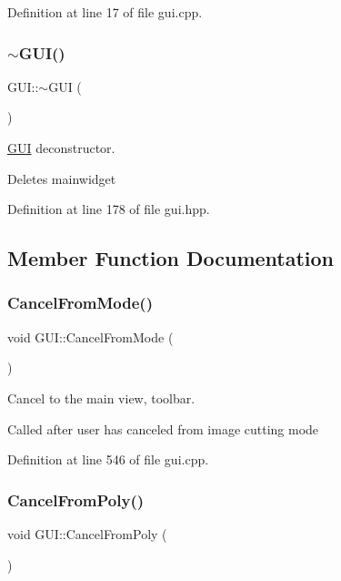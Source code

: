Definition at line 17 of file gui.\+cpp.

\mbox{\label{classGUI_ac9cae2328dcb5d83bdfaeca49a2eb695}} 
\subsubsection{\texorpdfstring{$\sim$\+G\+U\+I()}{~GUI()}}
{\footnotesize\ttfamily G\+U\+I\+::$\sim$\+G\+UI (\begin{DoxyParamCaption}{ }\end{DoxyParamCaption})\hspace{0.3cm}{\ttfamily [inline]}}



\mbox{\hyperlink{classGUI}{G\+UI}} deconstructor. 

Deletes mainwidget 

Definition at line 178 of file gui.\+hpp.



\subsection{Member Function Documentation}
\mbox{\label{classGUI_a8188dd01b2dc9354afbbf2f4b18fd19a}} 
\subsubsection{\texorpdfstring{Cancel\+From\+Mode()}{CancelFromMode()}}
{\footnotesize\ttfamily void G\+U\+I\+::\+Cancel\+From\+Mode (\begin{DoxyParamCaption}{ }\end{DoxyParamCaption})}



Cancel to the main view, toolbar. 

Called after user has canceled from image cutting mode 

Definition at line 546 of file gui.\+cpp.

\mbox{\label{classGUI_a9f2b3abf533a7c720b817caed653da2e}} 
\subsubsection{\texorpdfstring{Cancel\+From\+Poly()}{CancelFromPoly()}}
{\footnotesize\ttfamily void G\+U\+I\+::\+Cancel\+From\+Poly (\begin{DoxyParamCaption}{ }\end{DoxyParamCaption})}



